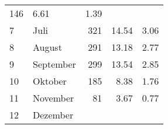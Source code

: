 \begin{longtable}{lXrrr}
       \num{146} &
       \num[round-mode=places,round-precision=2]{6,61} &
         \num[round-mode=places,round-precision=2]{1,39} \\

     7 &
     \multicolumn{1}{X}{ Juli   } &


       \num{321} &
       \num[round-mode=places,round-precision=2]{14,54} &
         \num[round-mode=places,round-precision=2]{3,06} \\

     8 &
     \multicolumn{1}{X}{ August   } &


       \num{291} &
       \num[round-mode=places,round-precision=2]{13,18} &
         \num[round-mode=places,round-precision=2]{2,77} \\

     9 &
     \multicolumn{1}{X}{ September   } &


       \num{299} &
       \num[round-mode=places,round-precision=2]{13,54} &
         \num[round-mode=places,round-precision=2]{2,85} \\

     10 &
     \multicolumn{1}{X}{ Oktober   } &


       \num{185} &
       \num[round-mode=places,round-precision=2]{8,38} &
         \num[round-mode=places,round-precision=2]{1,76} \\

     11 &
     \multicolumn{1}{X}{ November   } &


       \num{81} &
       \num[round-mode=places,round-precision=2]{3,67} &
         \num[round-mode=places,round-precision=2]{0,77} \\

     12 &
     \multicolumn{1}{X}{ Dezember   } &



\end{longtable}
